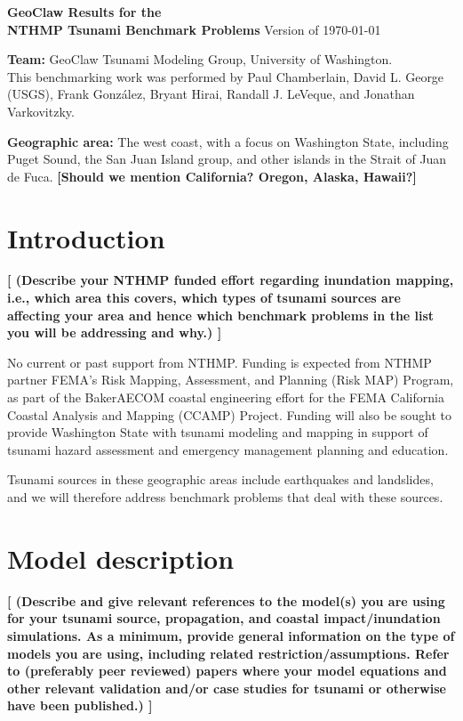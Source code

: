 \documentclass[11pt]{article}
\newcommand{\todo}[1]{{\bf \color{blue} [#1]}}
\begin{document}
\begin{center}
{{\Large\bf
GeoClaw Results for the \\
\vskip 3pt
NTHMP Tsunami Benchmark Problems}
\vskip 5pt
Version of \today}
\end{center}


\vskip 15pt
\noindent
{\bf Team:}  GeoClaw Tsunami Modeling Group, University of Washington.\\
This benchmarking work was performed by 
Paul Chamberlain,
David L. George (USGS),
Frank Gonz\'alez,
Bryant Hirai,
Randall J. LeVeque, and
Jonathan Varkovitzky.

\vskip 5pt
\noindent
{\bf Geographic area:}  The west coast, with a focus on Washington State,
including Puget Sound, the San Juan Island group, and other islands in the
Strait of Juan de Fuca.
\todo{Should we mention California?  Oregon, Alaska, Hawaii?}

\vskip 5pt
\section{Introduction}

\todo{
(Describe your NTHMP funded effort regarding inundation mapping, i.e., which
area this covers, which types of tsunami sources are affecting your area and
hence which benchmark problems in the list you will be addressing and why.)
}

No current or past support from NTHMP.
Funding is expected from NTHMP partner FEMA’s Risk Mapping, Assessment, and
Planning (Risk MAP) Program, as part of the BakerAECOM coastal engineering
effort for the FEMA California Coastal Analysis and Mapping (CCAMP) Project.
Funding will also be sought to provide Washington State with tsunami
modeling and mapping in support of tsunami hazard assessment and emergency
management planning and education.  

Tsunami sources in these geographic
areas include earthquakes and landslides, and we will therefore address
benchmark problems that deal with these sources.

\section{Model description}
\todo{
(Describe and give relevant references to the model(s) you are using for
your tsunami source, propagation, and coastal impact/inundation simulations.
As a minimum, provide general information on the type of models you are
using, including related restriction/assumptions. Refer to (preferably peer
reviewed) papers where your model equations and other relevant validation
and/or case studies for tsunami or otherwise have been published.)
}
\end{document}
